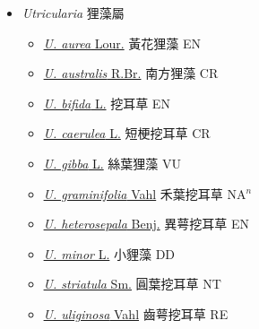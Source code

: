 
  \begin{itemize}
 \item[] \textit{Utricularia} 狸藻屬
                    
  \begin{itemize}
        \item[] \href{http://www.theplantlist.org/tpl1.1/search?q=Utricularia+aurea}{\textit{U. aurea} Lour.}   黃花狸藻 EN
        \item[] \href{http://www.theplantlist.org/tpl1.1/search?q=Utricularia+australis}{\textit{U. australis} R.Br.}   南方狸藻 CR
        \item[] \href{http://www.theplantlist.org/tpl1.1/search?q=Utricularia+bifida}{\textit{U. bifida} L.}   挖耳草 EN
        \item[] \href{http://www.theplantlist.org/tpl1.1/search?q=Utricularia+caerulea}{\textit{U. caerulea} L.}   短梗挖耳草 CR
        \item[] \href{http://www.theplantlist.org/tpl1.1/search?q=Utricularia+gibba}{\textit{U. gibba} L.}   絲葉狸藻 VU
        \item[] \href{http://www.theplantlist.org/tpl1.1/search?q=Utricularia+graminifolia}{\textit{U. graminifolia} Vahl}   禾葉挖耳草 NA$^n$
        \item[] \href{http://www.theplantlist.org/tpl1.1/search?q=Utricularia+heterosepala}{\textit{U. heterosepala} Benj.}   異萼挖耳草 EN
        \item[] \href{http://www.theplantlist.org/tpl1.1/search?q=Utricularia+minor}{\textit{U. minor} L.}   小貍藻 DD
        \item[] \href{http://www.theplantlist.org/tpl1.1/search?q=Utricularia+striatula}{\textit{U. striatula} Sm.}   圓葉挖耳草 NT
        \item[] \href{http://www.theplantlist.org/tpl1.1/search?q=Utricularia+uliginosa}{\textit{U. uliginosa} Vahl}   齒萼挖耳草 RE
  \end{itemize}
  \end{itemize}

